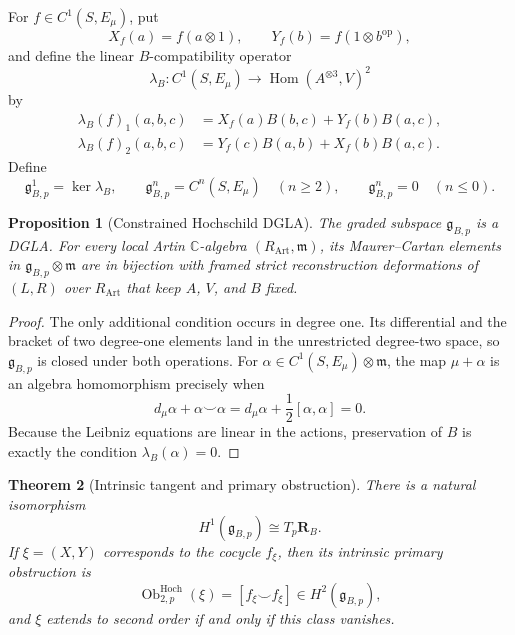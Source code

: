 \documentclass[11pt]{amsart}
\newtheorem{theorem}{Theorem}[section]
\newtheorem{proposition}[theorem]{Proposition}
\newcommand{\Hom}{\operatorname{Hom}}
\newcommand{\C}{\mathbb C}
\newcommand{\ghoch}{\mathfrak g}
\begin{document}
For $f\in C^1(S,E_\mu)$, put
\[
X_f(a)=f(a\otimes1),
\qquad
Y_f(b)=f(1\otimes b^{\mathrm{op}}),
\]
and define the linear $B$-compatibility operator
\[
\lambda_B:C^1(S,E_\mu)\longrightarrow\Hom(A^{\otimes3},V)^2
\]
by
\begin{align*}
\lambda_B(f)_1(a,b,c)
&=X_f(a)B(b,c)+Y_f(b)B(a,c),\\
\lambda_B(f)_2(a,b,c)
&=Y_f(c)B(a,b)+X_f(b)B(a,c).
\end{align*}
Define
\[
\ghoch_{B,p}^{1}=\ker\lambda_B,
\qquad
\ghoch_{B,p}^{n}=C^n(S,E_\mu)\quad(n\ge2),
\qquad
\ghoch_{B,p}^{n}=0\quad(n\le0).
\]

\begin{proposition}[Constrained Hochschild DGLA]\label{prop:hoch-dgla}
The graded subspace $\ghoch_{B,p}$ is a DGLA.  For every local Artin $\C$-algebra $(R_{\mathrm{Art}},\mathfrak m)$, its Maurer--Cartan elements in $\ghoch_{B,p}\otimes\mathfrak m$ are in bijection with framed strict reconstruction deformations of $(L,R)$ over $R_{\mathrm{Art}}$ that keep $A$, $V$, and $B$ fixed.
\end{proposition}

\begin{proof}
The only additional condition occurs in degree one.  Its differential and the bracket of two degree-one elements land in the unrestricted degree-two space, so $\ghoch_{B,p}$ is closed under both operations.  For $\alpha\in C^1(S,E_\mu)\otimes\mathfrak m$, the map $\mu+\alpha$ is an algebra homomorphism precisely when
\[
d_\mu\alpha+\alpha\smile\alpha
=d_\mu\alpha+\frac12[\alpha,\alpha]=0.
\]
Because the Leibniz equations are linear in the actions, preservation of $B$ is exactly the condition $\lambda_B(\alpha)=0$.
\end{proof}

\begin{theorem}[Intrinsic tangent and primary obstruction]\label{thm:intrinsic-obstruction}
There is a natural isomorphism
\[
H^1(\ghoch_{B,p})\cong T_p\mathbf R_B.
\]
If $\xi=(X,Y)$ corresponds to the cocycle $f_\xi$, then its intrinsic primary obstruction is
\[
\operatorname{Ob}^{\mathrm{Hoch}}_{2,p}(\xi)
=[f_\xi\smile f_\xi]
\in H^2(\ghoch_{B,p}),
\]
and $\xi$ extends to second order if and only if this class vanishes.
\end{theorem}
\end{document}
